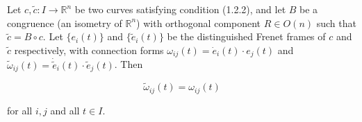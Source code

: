 Let $c, \tilde{c}: I \to \mathbb{R}^n$ be two curves satisfying condition (1.2.2), and let $B$ be a congruence (an isometry of $\mathbb{R}^n$) with orthogonal component $R \in O(n)$ such that $\tilde{c} = B \circ c$. Let $\{e_i(t)\}$ and $\{\tilde{e}_i(t)\}$ be the distinguished Frenet frames of $c$ and $\tilde{c}$ respectively, with connection forms $\omega_{ij}(t) = \dot{e}_i(t) \cdot e_j(t)$ and $\tilde{\omega}_{ij}(t) = \dot{\tilde{e}}_i(t) \cdot \tilde{e}_j(t)$. Then

$$\tilde{\omega}_{ij}(t) = \omega_{ij}(t)$$

for all $i, j$ and all $t \in I$.
